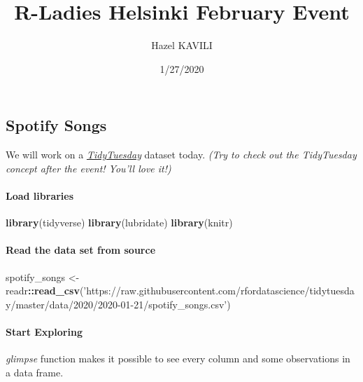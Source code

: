 \documentclass[]{article}
\title{R-Ladies Helsinki February Event}
\author{Hazel KAVILI}
\date{1/27/2020}
\newenvironment{Shaded}{\begin{snugshade}}{\end{snugshade}}
\newcommand{\KeywordTok}[1]{\textcolor[rgb]{0.13,0.29,0.53}{\textbf{#1}}}
\newcommand{\NormalTok}[1]{#1}
\newcommand{\OperatorTok}[1]{\textcolor[rgb]{0.81,0.36,0.00}{\textbf{#1}}}
\newcommand{\StringTok}[1]{\textcolor[rgb]{0.31,0.60,0.02}{#1}}
\let\oldparagraph\paragraph
\renewcommand{\paragraph}[1]{\oldparagraph{#1}\mbox{}}
\begin{document}
\maketitle

\hypertarget{spotify-songs}{%
\subsection{Spotify Songs}\label{spotify-songs}}

We will work on a
\emph{\href{https://github.com/rfordatascience/tidytuesday/blob/master/data/2020/2020-01-21/readme.md}{TidyTuesday}}
dataset today. \emph{(Try to check out the TidyTuesday concept after the
event! You'll love it!)}

\hypertarget{load-libraries}{%
\paragraph{Load libraries}\label{load-libraries}}

\begin{Shaded}
\begin{Highlighting}[]
\KeywordTok{library}\NormalTok{(tidyverse)}
\KeywordTok{library}\NormalTok{(lubridate)}
\KeywordTok{library}\NormalTok{(knitr)}
\end{Highlighting}
\end{Shaded}

\hypertarget{read-the-data-set-from-source}{%
\paragraph{Read the data set from
source}\label{read-the-data-set-from-source}}

\begin{Shaded}
\begin{Highlighting}[]
\NormalTok{spotify_songs <-}\StringTok{ }
\StringTok{  }\NormalTok{readr}\OperatorTok{::}\KeywordTok{read_csv}\NormalTok{(}\StringTok{'https://raw.githubusercontent.com/rfordatascience/tidytuesday/master/data/2020/2020-01-21/spotify_songs.csv'}\NormalTok{)}
\end{Highlighting}
\end{Shaded}

\hypertarget{start-exploring}{%
\paragraph{Start Exploring}\label{start-exploring}}

\emph{glimpse} function makes it possible to see every column and some
observations in a data frame.
\end{document}
